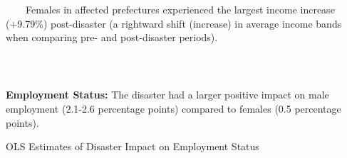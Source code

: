 \documentclass[serif, aspectratio=169]{beamer}
\newcommand{\incomebandlinks}{%
    \vfill %
    \hfill %
    {\small %
        \hyperlink{income_band}{\beamerbutton{Reference}} \,

    }
}
\begin{document}
\begin{frame}[label=income_band_main]
    \begin{column}{0.49\textwidth}
            \raggedright
    
    \vspace{-2.5cm}
    \hspace{-1.1cm}
\large {\qquad \ \ \ \ Females in affected prefectures experienced the largest income increase (+9.79\%) post-disaster (a rightward shift (increase) in average income bands when comparing pre- and post-disaster periods).}
    \end{column}
\vspace{-0.7cm}
\incomebandlinks
\end{frame}

\begin{frame}[label=employed]

\textbf{Employment Status:} The disaster had a larger positive impact on male employment (2.1-2.6 percentage points) compared to females (0.5 percentage points).

\begin{table}[htbp]
\centering
\caption{OLS Estimates of Disaster Impact on Employment Status}

\vspace{-0.2cm}



\end{table}
\end{frame}
\end{document}
